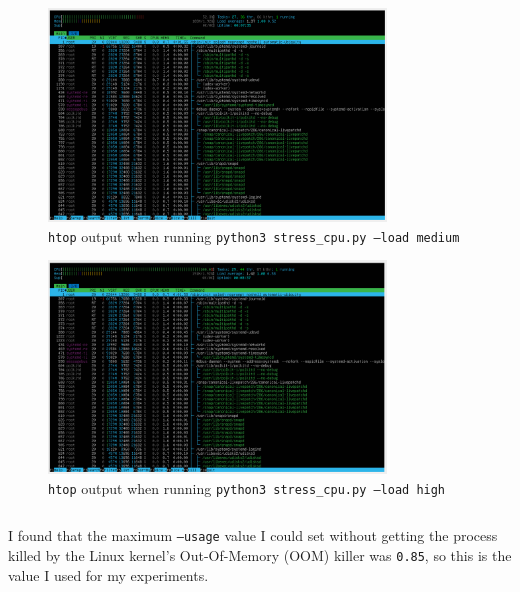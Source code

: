 \documentclass[a4paper]{article}
\newenvironment{code}{\captionsetup{type=listing}}{}
\begin{document}
\begin{figure}[H]
    \centering
    \includegraphics[width=0.8\textwidth]{./images/medcpuload.png}
    \caption{\texttt{htop} output when running \texttt{python3 stress_cpu.py --load medium}}
\end{figure}

\begin{figure}[H]
    \centering
    \includegraphics[width=0.8\textwidth]{./images/highcpuload.png}
    \caption{\texttt{htop} output when running \texttt{python3 stress_cpu.py --load high}}
\end{figure}

\begin{code}
\inputminted[linenos, breaklines, frame=single]{python}{../code/stressers/stress_memory.py}
\caption{\texttt{stress\_memory.py}}
\end{code}

I found that the maximum \texttt{--usage} value I could set without getting the process killed by the Linux kernel's Out-Of-Memory (OOM) killer was \texttt{0.85}, so this is the value I used for my experiments.
\end{document}
